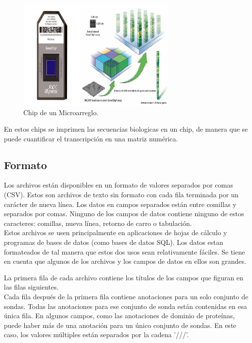 \documentclass[12pt,letterpaper]{article}
\begin{document}
\begin{figure}[H]
\begin{center}
\includegraphics[width=0.7\textwidth]{Genechip.png}
\end{center}
\caption{Chip de un Microarreglo.}
\end{figure}
En estos chips se imprimen las secuencias biologicas en un chip, de manera que se puede cuantificar el transcripción en una matriz numérica.	
\subsection{Formato}
Los archivos están disponibles en un formato de valores separados por comas (CSV). Estos son archivos de texto sin formato con cada fila terminada por un carácter de nueva línea. Los datos en campos separados están entre comillas y separados por comas. Ninguno de los campos de datos contiene ninguno de estos caracteres: comillas, nueva línea, retorno de carro o tabulación.\\

Estos archivos se usen principalmente en aplicaciones de hojas de cálculo y programas de bases de datos (como bases de datos SQL). Los datos estan formateados de tal manera que estos dos usos sean relativamente fáciles. Se tiene en cuenta que algunos de los archivos y los campos de datos en ellos son grandes. 

La primera fila de cada archivo contiene los títulos de los campos que figuran en las filas siguientes.\\

Cada fila después de la primera fila contiene anotaciones para un solo conjunto de sondas. Todas las anotaciones para ese conjunto de sonda están contenidas en esa única fila. En algunos campos, como las anotaciones de dominio de proteínas, puede haber más de una anotación para un único conjunto de sondas. En este caso, los valores múltiples están separados por la cadena '///'.\\
\end{document}
